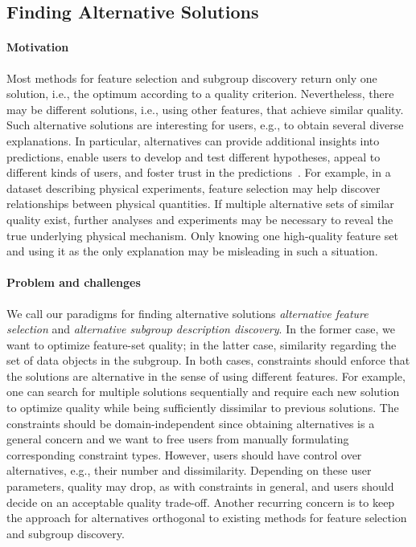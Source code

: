 \subsection{Finding Alternative Solutions}
\label{sec:introduction:research-gaps:finding-alternative-solutions}

\paragraph{Motivation}

Most methods for feature selection and subgroup discovery return only one solution, i.e., the optimum according to a quality criterion.
Nevertheless, there may be different solutions, i.e., using other features, that achieve similar quality.
Such alternative solutions are interesting for users, e.g., to obtain several diverse explanations.
In particular, alternatives can provide additional insights into predictions, enable users to develop and test different hypotheses, appeal to different kinds of users, and foster trust in the predictions~\cite{kim2021multi, wang2019designing}.
For example, in a dataset describing physical experiments, feature selection may help discover relationships between physical quantities.
If multiple alternative sets of similar quality exist, further analyses and experiments may be necessary to reveal the true underlying physical mechanism.
Only knowing one high-quality feature set and using it as the only explanation may be misleading in such a situation.

\paragraph{Problem and challenges}

We call our paradigms for finding alternative solutions \emph{alternative feature selection} and \emph{alternative subgroup description discovery}.
In the former case, we want to optimize feature-set quality; in the latter case, similarity regarding the set of data objects in the subgroup.
In both cases, constraints should enforce that the solutions are alternative in the sense of using different features.
For example, one can search for multiple solutions sequentially and require each new solution to optimize quality while being sufficiently dissimilar to previous solutions.
The constraints should be domain-independent since obtaining alternatives is a general concern and we want to free users from manually formulating corresponding constraint types.
However, users should have control over alternatives, e.g., their number and dissimilarity.
Depending on these user parameters, quality may drop, as with constraints in general, and users should decide on an acceptable quality trade-off.
Another recurring concern is to keep the approach for alternatives orthogonal to existing methods for feature selection and subgroup discovery.

